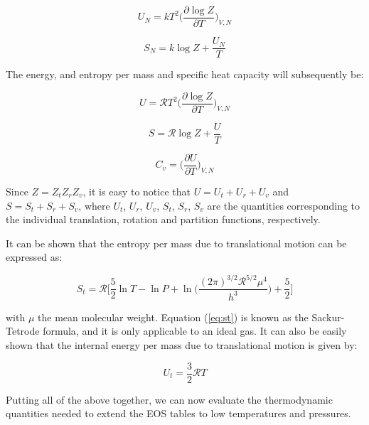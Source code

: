 \documentclass[apj]{emulateapj}
\begin{document}
\begin{equation}
\label{eq:U}
U_N=k T^2 \Big(\frac{\partial \log{Z}}{\partial T}\Big)_{V, N}
\end{equation}

\begin{equation}
\label{eq:S}
S_N=k \log{Z} + \frac{U_N}{T}
\end{equation}

The energy, and entropy per mass and specific heat capacity will subsequently be:

\begin{equation}
\label{eq:u}
U=\mathcal{R} T^2 \Big(\frac{\partial \log{Z}}{\partial T}\Big)_{V, N}
\end{equation}

\begin{equation}
\label{eq:s}
S=\mathcal{R} \log{Z} + \frac{U}{T}
\end{equation}

\begin{equation}
\label{eq:cv}
C_v=\Big(\frac{\partial U}{\partial T}\Big)_{V, N}
\end{equation}


Since $Z=Z_t Z_r Z_v$, it is easy to notice that $U=U_t+U_r+U_v$ and $S=S_t+S_r+S_v$, where $U_t$, $U_r$, $U_v$, $S_t$, $S_r$, $S_v$ are the quantities corresponding to the individual translation, rotation and partition functions, respectively.

It can be shown that the entropy per mass due to translational motion can be expressed as:

\begin{equation}
\label{eq:st}
S_t=\mathcal{R} \Big[ \frac{5}{2} \ln{T} - \ln{P} + \ln \Big( \frac{(2 \pi)^{3/2} \mathcal{R}^{5/2} \mu^4}{h^3}\Big) +\frac{5}{2} \Big]
\end{equation}

\noindent with $\mu$ the mean molecular weight. Equation (\ref{eq:st}) is known as the Sackur-Tetrode formula, and it is only applicable to an ideal gas. It can also be easily shown that the internal energy per mass due to translational motion is given by:

\begin{equation}
\label{eq:ut}
U_t=\frac{3}{2} \mathcal{R} T
\end{equation}

Putting all of the above together, we can now evaluate the thermodynamic quantities needed to extend the \cite{saumon95} EOS tables to low temperatures and pressures.
\end{document}
